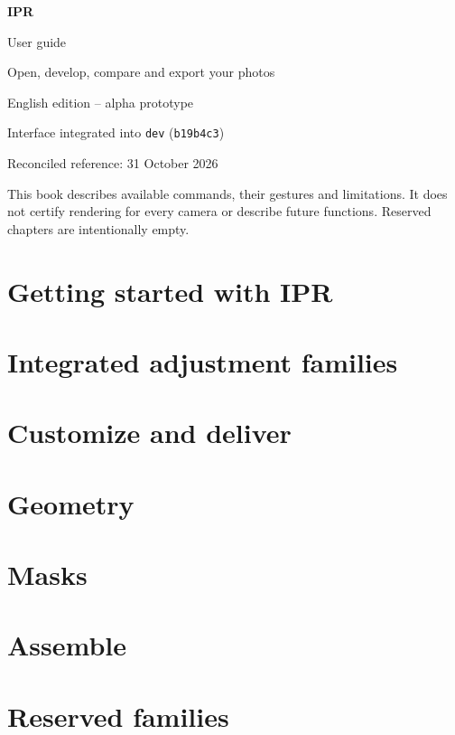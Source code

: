\documentclass[12pt,a4paper,oneside]{report}
\begin{document}
\begin{titlepage}
\centering
\vspace*{2cm}
{\Huge\bfseries IPR\par}
\vspace{0.5cm}
{\LARGE User guide\par}
\vspace{1cm}
{\large Open, develop, compare and export your photos\par}
\vfill
English edition -- alpha prototype\par
Interface integrated into \texttt{dev} (\texttt{b19b4c3})\par
Reconciled reference: 31 October 2026\par
\vfill
\begin{minipage}{0.88\textwidth}
This book describes available commands, their gestures and limitations.
It does not certify rendering for every camera or describe future functions.
Reserved chapters are intentionally empty.
\end{minipage}
\end{titlepage}
\hypersetup{pageanchor=true}
\tableofcontents
\clearpage
{}
\part{Getting started with IPR}



\part{Integrated adjustment families}










\part{Customize and deliver}



\part{Geometry}

\part{Masks}

\part{Assemble}

\part{Reserved families}

\appendix


\end{document}
